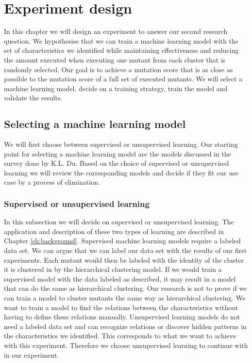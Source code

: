 \documentclass[../../main]{subfiles}
\begin{document}
\clearpage
\section{Experiment design}
In this chapter we will design an experiment to answer our second research question.
We hypothesise that we can train a machine learning model with the set of characteristics we identified
while maintaining effectiveness and reducing the amount executed when executing one mutant from each cluster that is randomly selected.
Our goal is to achieve a mutation score that is as close as possible to the mutation score of a full set of executed mutants.
We will select a machine learning model, decide on a training strategy, train the model and validate the results.

\subsection{Selecting a machine learning model}
We will first choose between supervised or unsupervised learning.
Our starting point for selecting a machine learning model are the models discussed in the survey done by K.L. Du.
Based on the choice of supervised or unsupervised learning we will review the corresponding models and decide if they fit our use case by a process of elimination.

\subsubsection{Supervised or unsupervised learning}
In this subsection we will decide on supervised or unsupervised learning.
The application and description of these two types of learning are described in Chapter \ref{ch:background}.
\newline
Supervised machine learning models require a labeled data set.
We can argue that we can label our data set with the results of our first experiments.
Each mutant would then be labeled with the identity of the cluster it is clustered in by the hierarchical clustering model.
If we would train a supervised model with the data labeled as described, it may result in a model that can do the same as hierarchical clustering.
Our research is not to prove if we can train a model to cluster mutants the same way as hierarchical clustering.
We want to train a model to find the relations between the characteristics without having to define these relations manually.
\newline
Unsupervised learning models do not need a labeled data set and can recognize relations or discover hidden patterns in the characteristics we identified.
This corresponds to what we want to achieve with this experiment.
Therefore we choose unsupervised learning to continue with in our experiment.
\end{document}
